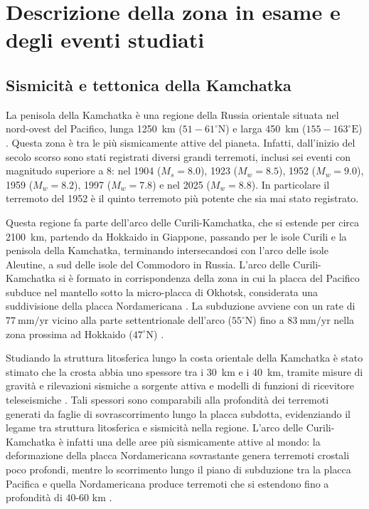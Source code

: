 \chapter{Descrizione della zona in esame e degli eventi studiati}

\section{Sismicità e tettonica della Kamchatka}
La penisola della Kamchatka è una regione della Russia orientale situata nel nord-ovest del Pacifico, lunga \qty{1250}{\kilo\meter} (\(51-61^\circ \text{N}\)) e larga \qty{450}{\kilo\meter} (\(155-163 ^\circ \text{E}\)) \citep{glacier_mass}. Questa zona è tra le più sismicamente attive del pianeta. Infatti, dall'inizio del secolo scorso sono stati registrati diversi grandi terremoti, inclusi sei eventi con magnitudo superiore a 8: nel 1904 (\(M_s = 8.0\)), 1923 (\(M_w = 8.5\)), 1952 (\(M_w = 9.0\)), 1959 (\(M_w = 8.2\)), 1997 (\(M_w = 7.8\)) e nel 2025 (\(M_w = 8.8\)). In particolare il terremoto del 1952 è il quinto terremoto più potente che sia mai stato registrato.

Questa regione fa parte dell'arco delle Curili-Kamchatka, che si estende per circa \qty{2100}{\kilo\meter}, partendo da Hokkaido in Giappone, passando per le isole Curili e la penisola della Kamchatka, terminando intersecandosi con l'arco delle isole Aleutine, a sud delle isole del Commodoro in Russia.
L'arco delle Curili-Kamchatka si è formato in corrispondenza della zona in cui la placca del Pacifico subduce nel mantello sotto la micro-placca di Okhotsk, considerata una suddivisione della placca Nordamericana \citep{usgs2025qw60}. La subduzione avviene con un rate di \(77~\mathrm{mm/yr}\) vicino alla parte settentrionale dell'arco (\(55 ^\circ \text{N}\)) fino a \(83~\mathrm{mm/yr}\) nella zona prossima ad Hokkaido (\(47 ^\circ \text{N}\)) \citep{description}.

Studiando la struttura litosferica lungo la costa orientale della Kamchatka è stato stimato che la crosta abbia uno spessore tra i \qty{30}{\kilo\meter} e i \qty{40}{\kilo\meter}, tramite misure di gravità e rilevazioni sismiche a sorgente attiva \citep{bogdanov2000tectonic} e modelli di funzioni di ricevitore teleseismiche \citep{levin2002}.
Tali spessori sono comparabili alla profondità dei terremoti generati da faglie di sovrascorrimento lungo la placca subdotta, evidenziando il legame tra struttura litosferica e sismicità nella regione.
L'arco delle Curili-Kamchatka è infatti una delle aree più sismicamente attive al mondo: la deformazione della placca Nordamericana sovrastante genera terremoti crostali poco profondi, mentre lo scorrimento lungo il piano di subduzione tra la placca Pacifica e quella Nordamericana produce terremoti che si estendono fino a profondità di 40-60 km \citep{usgs2025qw60}.

